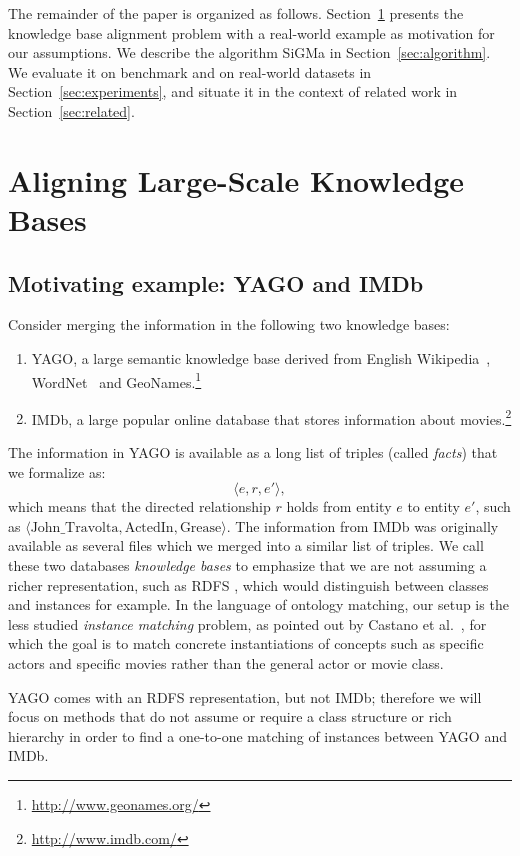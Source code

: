 \documentclass{sig-alternate}
\newcommand{\previousversion}[1]{}
\begin{document}
The remainder of the paper is organized as follows. Section~\ref{sec:problem} presents the knowledge base alignment problem with a real-world example as motivation for our assumptions. We describe the algorithm \textsf{SiGMa} in Section~\ref{sec:algorithm}. We evaluate it on benchmark and on real-world datasets in Section~\ref{sec:experiments}, and situate it in the context of related work in Section~\ref{sec:related}.



\section{Aligning Large-Scale Knowledge Bases} \label{sec:problem}

\subsection{Motivating example: \textsf{YAGO} and \textsf{IMDb}}
Consider merging the information in the following two knowledge bases:
\begin{enumerate}
    \item \textsf{YAGO}, a large semantic knowledge base derived from English Wikipedia~\cite{suchanek2007WWW}, WordNet~\cite{wordnet} and GeoNames.\footnote{\href{http://www.geonames.org/}{http://www.geonames.org/}}
 \item \textsf{IMDb}, a large popular online database that stores information about movies.\footnote{\href{http://www.imdb.com/}{http://www.imdb.com/}}
\end{enumerate}
The information in \textsf{YAGO} is available as a long list of triples (called \emph{facts}) that we formalize as:
\begin{equation}
\label{eq:triplet}
\langle e, r, e'\rangle,
\end{equation}
which means that the directed relationship $r$ holds from entity $e$ to entity $e'$, such as $\langle \textrm{John\_Travolta}, \textrm{ActedIn}, \textrm{Grease}\rangle$. The information from \textsf{IMDb} was originally available as several files which we merged into a similar list of triples.  We call these two databases \emph{knowledge bases} to emphasize that we are not assuming a richer representation, such as RDFS \cite{RDFs}, which would distinguish between classes and instances for example. In the language of ontology matching, our setup is the less studied \emph{instance matching} problem, as point\-ed out by Castano et al.~\cite{castano08instanceMatching}, for which the goal is to match concrete instantiations of concepts such as specific actors and specific movies rather than the general actor or movie class.
%
\previousversion{
%
%
%
}
%
%
\textsf{YAGO} comes with an RDFS representation, but not \textsf{IMDb}; therefore we will focus on methods that do not assume or require a class structure or rich hierarchy in order to find a one-to-one matching of instances between \textsf{YAGO} and \textsf{IMDb}.
\end{document}
